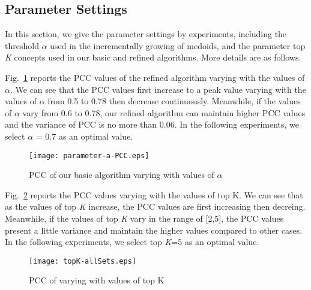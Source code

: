 \subsection{Parameter Settings}
In this section, we give the parameter settings by experiments, including the threshold $\alpha$ used in the incrementally growing of medoids,
and the parameter top \emph{K} concepts used in our basic and refined algorithms. More details are as follows.

Fig.~\ref{fig:init} reports the PCC values of the refined algorithm varying with the values of $\alpha$. We can see that the PCC values first
increase to a peak value varying with the values of $\alpha$ from 0.5 to 0.78 then decrease continuously. Meanwhile, if the values of $\alpha$
vary from 0.6 to 0.78, our refined algorithm can maintain higher PCC values and the variance of PCC is no more than 0.06. In the following
experiments, we select $\alpha$ = 0.7 as an optimal value.
\begin{figure}[th]
 \centering
 \texttt{[image: parameter-a-PCC.eps]}
 \caption{PCC of our basic algorithm varying with values of $\alpha$}
 \label{fig:init}
\end{figure}

Fig.~\ref{fig:topK} reports the PCC values varying with the values of top K. We can see that as the values of top \emph{K} increase, the PCC
values are first increasing then decreing. Meanwhile, if the values of top \emph{K} vary in the range of [2,5], the PCC values present a little
variance and maintain the higher values compared to other cases. In the following experiments, we select top \emph{K}=5 as an optimal value.
\begin{figure}[th]
 \centering
 \texttt{[image: topK-allSets.eps]}
 \caption{PCC of varying with values of top K}
 \label{fig:topK}
\end{figure}

